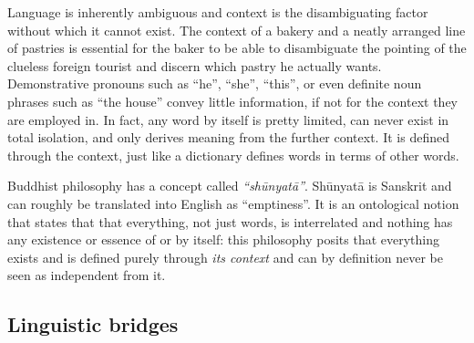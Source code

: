Language is inherently ambiguous and context is the disambiguating factor
without which it cannot exist. The context of a bakery and a neatly arranged
line of pastries is essential for the baker to be able to disambiguate the
pointing of the clueless foreign tourist and discern which pastry he actually
wants. Demonstrative pronouns such as ``he'', ``she'', ``this'', or even
definite noun phrases such as ``the house'' convey little information, if not
for the context they are employed in.  In fact, any word by itself is pretty
limited, can never exist in total isolation, and only derives meaning from the
further context. It is defined through the context, just like a
dictionary defines words in terms of other words.


Buddhist philosophy has a concept called \emph{``sh\=unyat\=a''}. Sh\=unyat\=a is Sanskrit and can
roughly be translated into English as ``emptiness''. It is an ontological
notion that states that that everything, not just words, is interrelated and nothing has any
existence or essence of or by itself: this philosophy posits that everything
exists and is defined purely through \emph{its context} and can by definition
never be seen as independent from it.

\subsection*{Linguistic bridges}
\label{sec:bridges}

